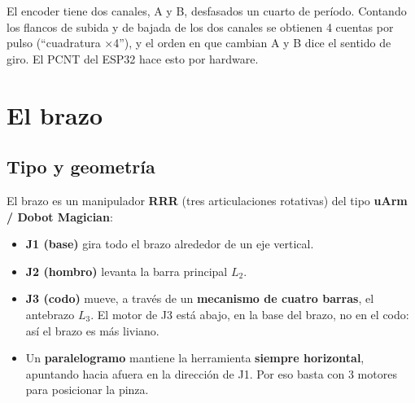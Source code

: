 \begin{nota}
El encoder tiene dos canales, A y B, desfasados un cuarto de período. Contando los flancos de subida y de bajada de
los dos canales se obtienen 4 cuentas por pulso (``cuadratura ×4''), y el orden en que cambian A y B dice el
sentido de giro. El PCNT del ESP32 hace esto por hardware.
\end{nota}

\section{El brazo}

\subsection{Tipo y geometría}
El brazo es un manipulador \textbf{RRR} (tres articulaciones rotativas) del tipo \textbf{uArm / Dobot Magician}:
\begin{itemize}
  \item \textbf{J1 (base)} gira todo el brazo alrededor de un eje vertical.
  \item \textbf{J2 (hombro)} levanta la barra principal $L_2$.
  \item \textbf{J3 (codo)} mueve, a través de un \textbf{mecanismo de cuatro barras}, el antebrazo $L_3$. El motor
        de J3 está abajo, en la base del brazo, no en el codo: así el brazo es más liviano.
  \item Un \textbf{paralelogramo} mantiene la herramienta \textbf{siempre horizontal}, apuntando hacia afuera en
        la dirección de J1. Por eso basta con 3 motores para posicionar la pinza.
\end{itemize}

